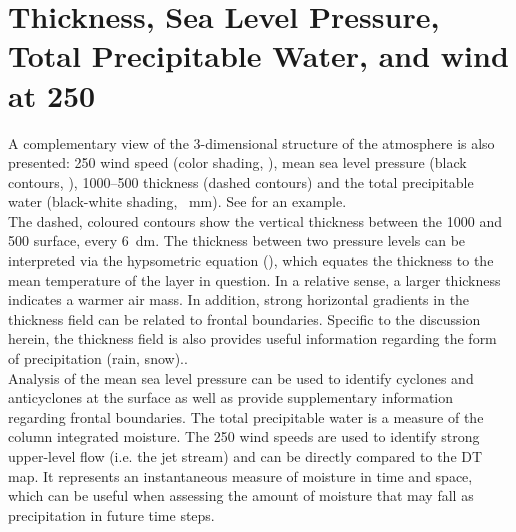 \section{Thickness, Sea Level Pressure, Total Precipitable Water, and wind at \SI{250}{\hPa}}
\label{sec:Geop}
A complementary view of the 3-dimensional structure of the atmosphere is also presented:  \SI{250}{\hPa} wind speed (color shading, \SI{}{\mPs}), mean sea level pressure (black contours, \SI{}{\hPa}), \num{1000}--\SI{500}{\hPa} thickness (dashed contours) and the total precipitable water (black-white shading, \SI{}{\mm}). See  for an example.
% 
\\
The dashed, coloured contours show the vertical thickness between the \SI{1000}{\hPa} and \SI{500}{\hPa} surface, every \SI{6}{\deca\meter}. The thickness between two pressure levels can be interpreted via the hypsometric equation (), which equates the thickness to the mean temperature of the layer in question. In a relative sense, a larger thickness indicates a warmer air mass. In addition, strong horizontal gradients in the thickness field can be related to frontal boundaries.  Specific to the discussion herein, the thickness field is also provides useful information regarding the form of precipitation (rain, snow)..
\\
Analysis of the mean sea level pressure can be used to identify cyclones and anticyclones at the surface as well as provide supplementary information regarding frontal boundaries.
The total precipitable water is a measure of the column integrated moisture.
The \SI{250}{\hPa} wind speeds are used to identify strong upper-level flow (i.e. the jet stream) and can be directly compared to the DT map.
It represents an instantaneous measure of moisture in time and space, which can be useful when assessing the amount of moisture that may fall as precipitation in future time steps.

% 

